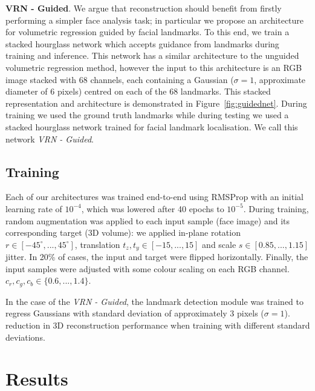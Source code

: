 \textbf{VRN - Guided}. We argue that reconstruction should benefit
from firstly performing a simpler face analysis task; in particular we
propose an architecture for volumetric regression guided by facial
landmarks. To this end, we train a stacked hourglass network which
accepts guidance from landmarks during training and inference. This
network has a similar architecture to the unguided volumetric
regression method, however the input to this architecture is an RGB
image stacked with 68 channels, each containing a Gaussian ($\sigma =
1$, approximate diameter of 6 pixels) centred on each of the 68
landmarks. This stacked representation and architecture is
demonstrated in Figure~\ref{fig:guidednet}. During training we used the
ground truth landmarks while during testing we used a stacked
hourglass network trained for facial landmark localisation. We call
this network \textit{VRN - Guided}.




\subsection{Training}

Each of our architectures was trained end-to-end using RMSProp with an
initial learning rate of $10^{-4}$, which was lowered after 40 epochs
to $10^{-5}$. During training, random augmentation was applied to each
input sample (face image) and its corresponding target (3D volume): we
applied in-plane rotation $r\in[-45^{\circ}, ..., 45^{\circ}]$,
translation $t_z,t_y\in[-15,...,15]$ and scale $s\in [0.85,...,1.15]$
jitter. In 20\% of cases, the input and target were flipped
horizontally. Finally, the input samples were adjusted with some
colour scaling on each RGB channel. %
$c_r,c_g,c_b \in \{0.6,...,1.4\}$.

In the case of the \textit{VRN - Guided}, the landmark detection
module was trained to regress Gaussians with standard deviation of
approximately 3 pixels ($\sigma = 1$). %
reduction in 3D reconstruction performance when training with
different standard deviations.



\section{Results} \label{S:Results}

